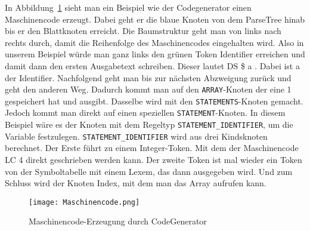 In Abbildung~\ref{fig:codegenerator} sieht man ein Beispiel wie der Codegenerator einen Maschinencode erzeugt. Dabei geht er die blaue Knoten von dem ParseTree hinab bis er den Blattknoten erreicht. Die Baumstruktur geht man von links nach rechts durch, damit die Reihenfolge des Maschinencodes eingehalten wird. Also in unserem Beispiel würde man ganz links den grünen Token Identifier erreichen und damit dann den ersten Ausgabetext schreiben. Dieser lautet DS \$ a . Dabei ist a der Identifier. Nachfolgend geht man bis zur nächsten Abzweigung zurück und geht den anderen Weg. Dadurch kommt man auf den \texttt{ARRAY}-Knoten der eine 1 gespeichert hat und ausgibt. Dasselbe wird mit den \texttt{STATEMENTS}-Knoten gemacht. Jedoch  kommt man direkt auf  einen speziellen \texttt{STATEMENT}-Knoten. In diesem Beispiel wäre es der Knoten mit dem Regeltyp \texttt{STATEMENT\_IDENTIFIER}, um die Variable festzulegen. \texttt{STATEMENT\_IDENTIFIER} wird aus drei Kindsknoten berechnet. Der Erste führt zu einem Integer-Token. Mit dem der Maschinencode LC 4 direkt geschrieben werden kann. Der zweite Token ist mal wieder ein Token von der Symboltabelle mit einem Lexem, das dann ausgegeben wird. Und zum Schluss wird der Knoten Index, mit dem man das Array aufrufen kann.
\vspace{4cm}

\begin{figure}[!htb]
    \centering
      \texttt{[image: Maschinencode.png]}
    \caption{Maschinencode-Erzeugung durch CodeGenerator}\label{fig:codegenerator}
\end{figure}
